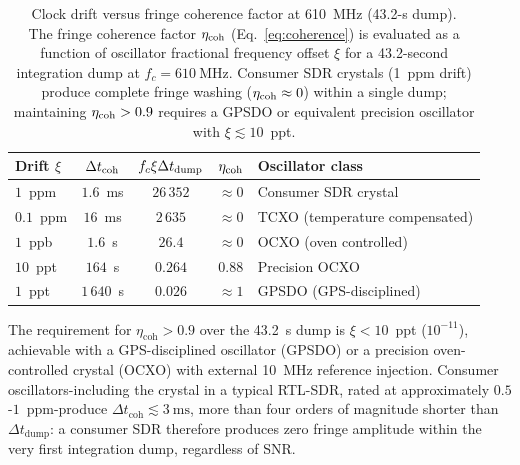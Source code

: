 \begin{table}[H]
  \centering
  \caption[Clock drift versus fringe coherence factor at 610~MHz (43.2-s dump)]{Clock drift versus fringe coherence factor at 610~MHz (43.2-s dump).\\[4pt]
  The fringe coherence factor $\eta_{\rm coh}$ (Eq.~\eqref{eq:coherence})
  is evaluated as a function of oscillator fractional frequency offset
  $\xi$ for a 43.2-second integration dump at $f_c=\SI{610}{\mega\hertz}$.
  Consumer SDR crystals (1~ppm drift) produce complete fringe washing
  ($\eta_{\rm coh}\approx0$) within a single dump; maintaining
  $\eta_{\rm coh}>0.9$ requires a GPSDO or equivalent precision oscillator
  with $\xi\lesssim10$~ppt.}
  \label{tab:clock-drift}
  \renewcommand{\arraystretch}{1.25}
  \begin{tabularx}{\textwidth}{l c c c >{\raggedright\arraybackslash}X}
    \toprule
    \textbf{Drift $\xi$} & \textbf{$\Delta t_{\rm coh}$}
      & \textbf{$f_c\xi\Delta t_{\rm dump}$}
      & \textbf{$\eta_{\rm coh}$} & \textbf{Oscillator class} \\
    \midrule
    $1$~ppm         & $1.6$~ms         & $26\,352$  & $\approx 0$   & Consumer SDR crystal \\
    $0.1$~ppm       & $16$~ms          & $2\,635$   & $\approx 0$   & TCXO (temperature compensated) \\
    $1$~ppb         & $1.6$~s          & $26.4$     & $\approx 0$   & OCXO (oven controlled) \\
    $10$~ppt        & $164$~s          & $0.264$    & $0.88$        & Precision OCXO \\
    $1$~ppt         & $1\,640$~s       & $0.026$    & $\approx 1$   & GPSDO (GPS-disciplined) \\
    \bottomrule
  \end{tabularx}
\end{table}

The requirement for $\eta_{\mathrm{coh}}>0.9$ over the \SI{43.2}{\second} dump is
$\xi<10$~ppt ($10^{-11}$), achievable with a GPS-disciplined oscillator
(GPSDO) or a precision oven-controlled crystal (OCXO) with external \SI{10}{\mega\hertz}
reference injection. Consumer oscillators-including the crystal in a typical
RTL-SDR, rated at approximately $0.5$-$1$~ppm-produce
$\Delta t_{\mathrm{coh}}\lesssim\SI{3}{\milli\second}$, more than four orders of
magnitude shorter than $\Delta t_{\mathrm{dump}}$: a consumer SDR therefore produces
zero fringe amplitude within the very first integration dump, regardless of SNR.

